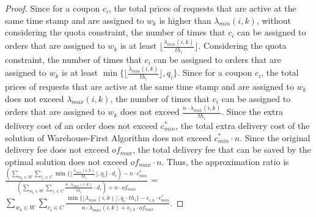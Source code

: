 \begin{proof}
	Since for a coupon $c_i$, the total prices of requests that are active at the same time stamp and are assigned to $w_k$ is higher than $\lambda_{min}(i, k)$, without considering the quota constraint, the number of times that $c_i$ can be assigned to orders that are assigned to $w_k$ is at least $\lfloor \frac{\lambda_{min}(i, k)}{th_i} \rfloor$. Considering the quota constraint, the number of times that $c_i$ can be assigned to orders that are assigned to $w_k$ is at least $\min \{\lfloor \frac{\lambda_{min}(i, k)}{th_i} \rfloor, q_i\}$. Since for a coupon $c_i$, the total prices of requests that are active at the same time stamp and are assigned to $w_k$ does not exceed $\lambda_{max}(i, k)$, the number of times that $c_i$ can be assigned to orders that are assigned to $w_k$ does not exceed $\frac{n \cdot \lambda_{max}(i, k)}{th_i}$. Since the extra delivery cost of an order does not exceed $c_{min}^*$, the total extra delivery cost of the solution of Warehouse-First Algorithm does not exceed $c_{min}^* \cdot n$. Since the original delivery fee does not exceed $of_{max}$, the total delivery fee that can be saved by the optimal solution does not exceed $of_{max} \cdot n$. Thus, the approximation ratio is $\frac{(\sum\limits_{w_k \in W}\sum\limits_{c_i \in C}\min \{\lfloor \frac{\lambda_{min}(i, k)}{th_i} \rfloor, q_i\} \cdot d_i) - n \cdot c_{min}^*}{(\sum\limits_{w_k \in W}\sum\limits_{c_i \in C} \frac{n \cdot \lambda_{max}(i, k)}{th_i} \cdot d_i) + n \cdot of_{max}}$ = $\sum\limits_{w_k \in W}\sum\limits_{c_i \in C}\frac{ \min \{\lfloor \lambda_{min}(i, k) \rfloor, q_i \cdot th_i\} - \epsilon_{i, k} \cdot c^*_{min}}{n \cdot \lambda_{max}(i, k) + \epsilon_{i, k} \cdot of_{max}}$.
\end{proof}

